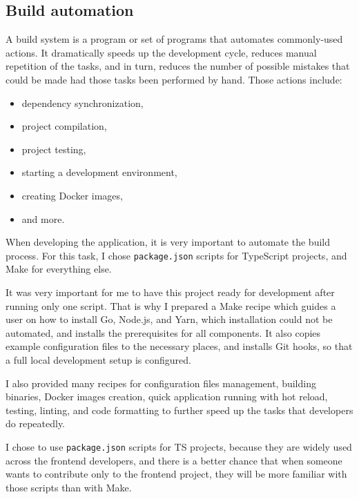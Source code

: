 \subsection{Build automation}\label{sec:build-automation}

A build system is a program or set of programs
that automates commonly-used actions.
It dramatically speeds up the development cycle,
reduces manual repetition of the tasks,
and in turn,
reduces the number of possible mistakes
that could be made had those tasks
been performed by hand.
Those actions include:
\begin{itemize}
  \item dependency synchronization,
  \item project compilation,
  \item project testing,
  \item starting a development environment,
  \item creating Docker images,
  \item and more.
\end{itemize}

When developing the application,
it is very important to automate the build process.
For this task,
I chose \texttt{package.json} scripts
for TypeScript projects,
and Make for everything else.

It was very important for me
to have this project ready for development
after running only one script.
That is why I prepared a Make recipe
which guides a user on how to install
Go, Node.js, and Yarn,
which installation could not be automated,
and installs the prerequisites for all components.
It also copies example configuration files
to the necessary places,
and installs Git hooks,
so that a full local development setup
is configured.

I also provided many recipes
for configuration files management,
building binaries,
Docker images creation,
quick application running with hot reload,
testing,
linting, and
code formatting
to further speed up the tasks
that developers do repeatedly.

I chose to use \texttt{package.json} scripts
for TS projects,
because they are widely used
across the frontend developers,
and there is a better chance
that when someone wants to contribute
only to the frontend project,
they will be more familiar with those scripts
than with Make.
